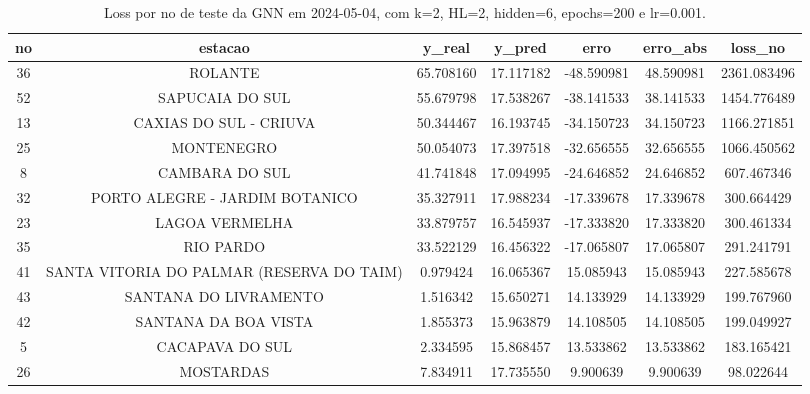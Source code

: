 \begin{table}[h]
\centering
\caption{Loss por no de teste da GNN em 2024-05-04, com k=2, HL=2, hidden=6, epochs=200 e lr=0.001.}
\label{tab:gnn_loss_k2_hl2_h6_e200_d20240504}
\begin{tabular}{ccccccc}
\toprule
no & estacao & y\_real & y\_pred & erro & erro\_abs & loss\_no \\
\midrule
36 & ROLANTE & 65.708160 & 17.117182 & -48.590981 & 48.590981 & 2361.083496 \\
52 & SAPUCAIA DO SUL & 55.679798 & 17.538267 & -38.141533 & 38.141533 & 1454.776489 \\
13 & CAXIAS DO SUL - CRIUVA & 50.344467 & 16.193745 & -34.150723 & 34.150723 & 1166.271851 \\
25 & MONTENEGRO & 50.054073 & 17.397518 & -32.656555 & 32.656555 & 1066.450562 \\
8 & CAMBARA DO SUL & 41.741848 & 17.094995 & -24.646852 & 24.646852 & 607.467346 \\
32 & PORTO ALEGRE - JARDIM BOTANICO & 35.327911 & 17.988234 & -17.339678 & 17.339678 & 300.664429 \\
23 & LAGOA VERMELHA & 33.879757 & 16.545937 & -17.333820 & 17.333820 & 300.461334 \\
35 & RIO PARDO & 33.522129 & 16.456322 & -17.065807 & 17.065807 & 291.241791 \\
41 & SANTA VITORIA DO PALMAR (RESERVA DO TAIM) & 0.979424 & 16.065367 & 15.085943 & 15.085943 & 227.585678 \\
43 & SANTANA DO LIVRAMENTO & 1.516342 & 15.650271 & 14.133929 & 14.133929 & 199.767960 \\
42 & SANTANA DA BOA VISTA & 1.855373 & 15.963879 & 14.108505 & 14.108505 & 199.049927 \\
5 & CACAPAVA DO SUL & 2.334595 & 15.868457 & 13.533862 & 13.533862 & 183.165421 \\
26 & MOSTARDAS & 7.834911 & 17.735550 & 9.900639 & 9.900639 & 98.022644 \\
\bottomrule
\end{tabular}
\end{table}
